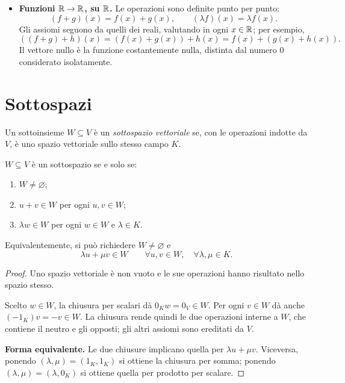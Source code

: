 \begin{itemize}
  \item \textbf{Funzioni $\mathbb{R}\to\mathbb{R}$, su $\mathbb{R}$.} Le operazioni sono definite punto per punto:
  \[
    (f+g)(x)=f(x)+g(x),\qquad (\lambda f)(x)=\lambda f(x).
  \]
  Gli assiomi seguono da quelli dei reali, valutando in ogni $x\in\mathbb{R}$; per esempio,
  \[
    ((f+g)+h)(x)=(f(x)+g(x))+h(x)=f(x)+(g(x)+h(x)).
  \]
  Il vettore nullo è la funzione costantemente nulla, distinta dal numero $0$ considerato isolatamente.
\end{itemize}

\section{Sottospazi}

\begin{definizione}
Un sottoinsieme $W\subseteq V$ è un \emph{sottospazio vettoriale} se, con le operazioni indotte da $V$, è uno spazio vettoriale sullo stesso campo $K$.
\end{definizione}

\begin{osservazione}
$W\subseteq V$ è un sottospazio se e solo se:
\begin{enumerate}[label=(\alph*)]
  \item $W\ne\varnothing$;
  \item $u+v\in W$ per ogni $u,v\in W$;
  \item $\lambda w\in W$ per ogni $w\in W$ e $\lambda\in K$.
\end{enumerate}
Equivalentemente, si può richiedere $W\ne\varnothing$ e
\[
  \lambda u+\mu v\in W\qquad\forall u,v\in W,\quad\forall\lambda,\mu\in K.
\]
\end{osservazione}
\begin{proof}
\passomath{\Rightarrow} Uno spazio vettoriale è non vuoto e le sue operazioni hanno risultato nello spazio stesso.

\passomath{\Leftarrow} Scelto $w\in W$, la chiusura per scalari dà $0_Kw=0_V\in W$. Per ogni $v\in W$ dà anche $(-1_K)v=-v\in W$. La chiusura rende quindi le due operazioni interne a $W$, che contiene il neutro e gli opposti; gli altri assiomi sono ereditati da $V$.

\textbf{Forma equivalente.} Le due chiusure implicano quella per $\lambda u+\mu v$. Viceversa, ponendo $(\lambda,\mu)=(1_K,1_K)$ si ottiene la chiusura per somma; ponendo $(\lambda,\mu)=(\lambda,0_K)$ si ottiene quella per prodotto per scalare.
\end{proof}

